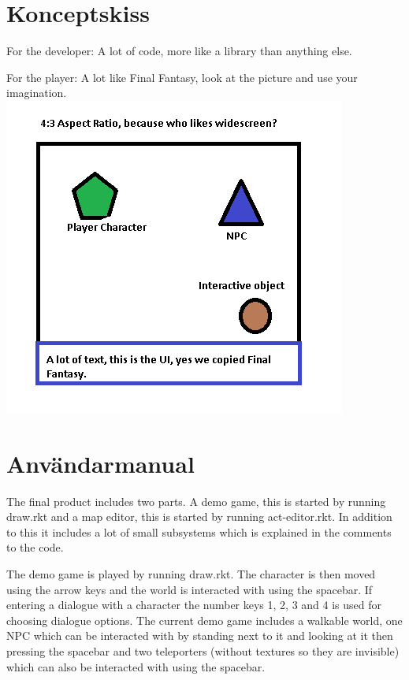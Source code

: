 \documentclass[12pt,a4paper]{article}
\begin{document}
\section{Konceptskiss}

For the developer: A lot of code, more like a library than anything else.

For the player: A lot like Final Fantasy, look at the picture and use your imagination.
\includegraphics{Koncept_sketch}




\section{Användarmanual}

The final product includes two parts.
A demo game, this is started by running draw.rkt and a map editor, this is started by running act-editor.rkt.
In addition to this it includes a lot of small subsystems which is explained in the comments to the code.

The demo game is played by running draw.rkt. The character is then moved using the arrow keys and the world is interacted with using the spacebar.
If entering a dialogue with a character the number keys 1, 2, 3 and 4 is used for choosing dialogue options.
The current demo game includes a walkable world, one NPC which can be interacted with by standing next to it and looking at it then pressing the spacebar and two teleporters (without textures so they are invisible) which can also be interacted with using the spacebar.
\end{document}
